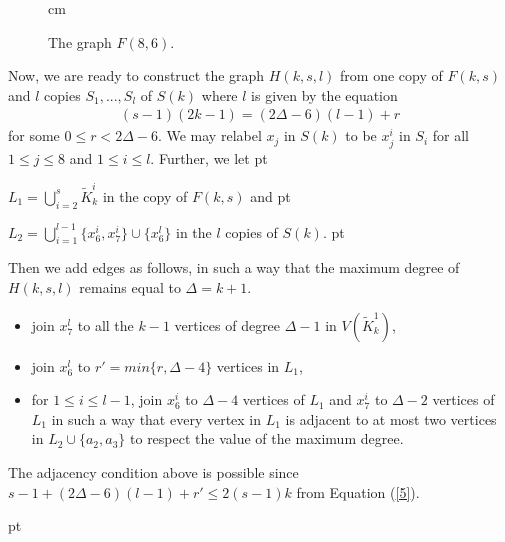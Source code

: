 \documentclass[11pt]{article}
\newcommand{\2}{ \vspace{0.2cm} }
\newcommand{\1}{ \vspace{0.1cm} }
\begin{document}
\begin{figure}[H]
{
 }%
 cm
\caption{The graph $F(8, 6)$.}
\label{f86}
\end{figure}


\indent Now, we are ready to construct the graph $H(k, s, l)$ from one copy of $F(k, s)$ and $l$ copies $S_{1}, ..., S_{l}$ of $S(k)$ where $l$ is given by the equation
\begin{align}\label{5}
(s-1)(2k-1) =  (2\Delta - 6)(l - 1) + r
\end{align}
\noindent for some $0 \leq r < 2\Delta -6$. We may relabel $x_{j}$ in $S(k)$ to be $x^{i}_{j}$ in $S_{i}$ for all $1 \leq j \leq 8$ and $1 \leq i \leq l$. Further, we let
 pt

\noindent $L_1=\bigcup_{i=2}^s\tilde{K}_k^i$ in the copy of $F(k,s)$ and
 pt

\noindent $L_{2} = \bigcup^{l-1}_{i= 1}\{x^{i}_{6}, x^{i}_{7}\} \cup\{x_6^l\}$ in the $l$ copies of $S(k)$.
 pt

\noindent Then we add edges as follows, in such a way that the maximum degree of $H(k,s,l)$ remains equal to $\Delta =k+1$.
\begin{itemize}
  \item join $x^{l}_{7}$ to all the $k - 1$ vertices of degree $\Delta - 1$ in $V(\tilde{K}^{1}_{k})$,
  \item join $x^{l}_{6}$ to $r'=min \{r,\Delta -4\}$ vertices in $L_1$,
  \item for $1\le i\le l-1$, join $x_6^i$ to $\Delta -4$ vertices of  $L_1$ and $x_7^i$ to $\Delta - 2$ vertices of $L_1$ in such a way that every vertex in $L_{1}$ is adjacent to at most two vertices in $L_{2}\cup \{a_2,a_3\}$ to respect the value of the maximum degree.
\end{itemize}
\noindent The adjacency condition above is possible since $s-1+(2\Delta -6)(l-1)+r' \le 2(s-1)k$ from Equation (\ref{5}).

 pt





\end{document}
